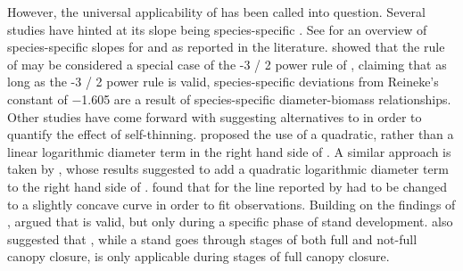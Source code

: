 However, the universal applicability of  has been called into question.  Several studies have hinted at its slope being species-specific \parencite{MacKinney1935,Pretzsch2005,Charru2012,Pretzsch2006,Río2001,Sterba1987,Vacchiano2013,Vospernik2015,Zeide1985,Zeide1987,VanderSchaaf2007}.  See  for an overview of species-specific slopes for \beech{} and \spruce{} as reported in the literature.  \textcite{Pretzsch2000,Pretzsch2002} showed that the rule of \textcite{Reineke1933} may be considered a special case of the \num{-3 / 2} power rule of \textcite{Yoda1963}, claiming that as long as the \num{-3 / 2} power rule is valid, species-specific deviations from Reineke’s constant of \num{-1.605} are a result of species-specific diameter-biomass relationships.  Other studies have come forward with suggesting alternatives to  in order to quantify the effect of self-thinning.  \textcite{Charru2012} proposed the use of a quadratic, rather than a linear logarithmic diameter term in the right hand side of . A similar approach is taken by \textcite{Schuetz2008,Schuetz2010,Zeide1995}, whose results suggested to add a quadratic logarithmic diameter term to the right hand side of .  \textcite{Meyer1938} found that for \ponderosa{} the line reported by \textcite{Reineke1933} had to be changed to a slightly concave curve in order to fit observations.  Building on the findings of \textcite{Drew1979}, \textcite{VanderSchaaf2010,VanderSchaaf2008} argued that  is valid, but only during a specific phase of stand development.  \textcite{Zeide1985} also suggested that , while a stand goes through stages of both full and not-full canopy closure,  is only applicable during stages of full canopy closure.

